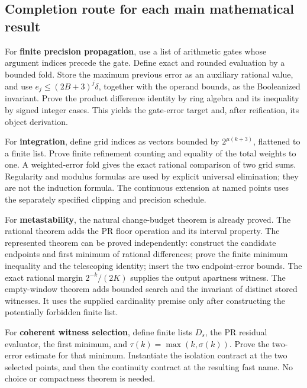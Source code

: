 \subsection{Completion route for each main mathematical result}

For \textbf{finite precision propagation}, use a list of arithmetic gates
whose argument indices precede the gate.  Define exact and rounded
evaluation by a bounded fold.  Store the maximum previous error as an
auxiliary rational value, and use
\(e_j\le(2B+3)^j\delta\), together with the operand bounds, as the
Booleanized invariant.  Prove the product difference identity by ring
algebra and its inequality by signed integer cases.  This yields the
gate-error target and, after reification, its object derivation.

For \textbf{integration}, define grid indices as vectors bounded by
\(2^{\mu(k+3)}\), flattened to a finite list.  Prove finite refinement
counting and equality of the total weights to one.  A weighted-error
fold gives the exact rational comparison of two grid sums.  Regularity
and modulus formulas are used by explicit universal elimination;
they are not the induction formula.  The continuous extension at named
points uses the separately specified clipping and precision schedule.

For \textbf{metastability}, the natural change-budget theorem is already
proved.  The rational theorem adds the PR floor operation and its
interval property.  The represented theorem can be proved independently:
construct the candidate endpoints and first minimum of rational
differences; prove the finite minimum inequality and the telescoping
identity; insert the two endpoint-error bounds.  The exact rational
margin \(2^{-k}/(2K)\) supplies the output apartness witness.  The
empty-window theorem adds bounded search and the invariant of distinct
stored witnesses.  It uses the supplied cardinality premise only after
constructing the potentially forbidden finite list.

For \textbf{coherent witness selection}, define finite lists \(D_s\),
the PR residual evaluator, the first minimum, and
\(\tau(k)=\max(k,\sigma(k))\).  Prove the two-error estimate for that
minimum.  Instantiate the isolation contract at the two selected points,
and then the continuity contract at the resulting fast name.  No
choice or compactness theorem is needed.

